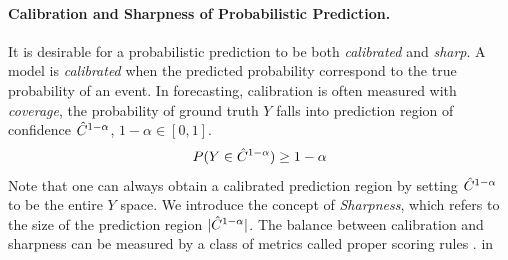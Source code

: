



\paragraph{Calibration and Sharpness of Probabilistic Prediction.} 
It is desirable for a probabilistic prediction to be both \textit{calibrated} and \textit{sharp}. A model is \textit{calibrated} when the predicted probability correspond to the true probability of an event. In forecasting, calibration is often measured with \textit{coverage}, the probability of ground truth ${Y}$ falls into prediction region of confidence $\Hat{C}^{1-\alpha}$, $1-\alpha \in [0,1]$. 
\begin{align}
    P(Y \in \Hat{C}^{1-\alpha}) \geq 1- \alpha
    \label{eq:coverage}
\end{align}
Note that one can always obtain a calibrated prediction region by setting $\Hat{C}^{1-\alpha}$ to be the entire $Y$ space. We introduce the concept of  \textit{Sharpness}, which refers to the size of the prediction region $|\Hat{C}^{1-\alpha}|$. The balance between calibration and sharpness can be measured by a class of metrics called proper scoring rules \cite{properscoring}.
 in
